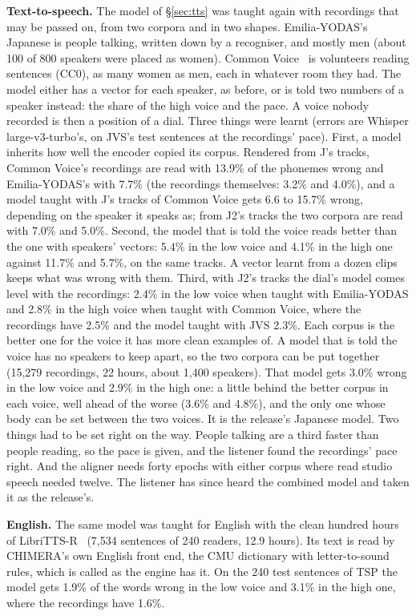 \documentclass[10pt,a4paper,twocolumn]{article}
\begin{document}
\textbf{Text-to-speech.} The model of \S\ref{sec:tts} was taught again with recordings that may
be passed on, from two corpora and in two shapes. Emilia-YODAS's Japanese is people talking,
written down by a recogniser, and mostly men (about 100 of 800 speakers were placed as women).
Common Voice~\cite{commonvoice} is volunteers reading sentences (CC0), as many women as men,
each in whatever room they had. The model either has a vector for each speaker, as before, or is
told two numbers of a speaker instead: the share of the high voice and the pace. A voice nobody
recorded is then a position of a dial. Three things were learnt (errors are Whisper
large-v3-turbo's, on JVS's test sentences at the recordings' pace). First, a model inherits how
well the encoder copied its corpus. Rendered from J's tracks, Common Voice's recordings are read
with 13.9\% of the phonemes wrong and Emilia-YODAS's with 7.7\% (the recordings themselves: 3.2\%
and 4.0\%), and a model taught with J's tracks of Common Voice gets 6.6 to 15.7\% wrong,
depending on the speaker it speaks as; from J2's tracks the two corpora are read with 7.0\% and
5.0\%. Second, the model that is told the voice reads better than the one with speakers' vectors:
5.4\% in the low voice and 4.1\% in the high one against 11.7\% and 5.7\%, on the same tracks. A
vector learnt from a dozen clips keeps what was wrong with them. Third, with J2's tracks the
dial's model comes level with the recordings: 2.4\% in the low voice when taught with
Emilia-YODAS and 2.8\% in the high voice when taught with Common Voice, where the recordings have
2.5\% and the model taught with JVS 2.3\%. Each corpus is the better one for the voice it has
more clean examples of. A model that is told the voice has no speakers to keep apart, so the two
corpora can be put together (15,279 recordings, 22 hours, about 1,400 speakers). That model gets
3.0\% wrong in the low voice and 2.9\% in the high one: a little behind the better corpus in
each voice, well ahead of the worse (3.6\% and 4.8\%), and the only one whose body can be set
between the two voices. It is the release's Japanese model. Two things had to be set right on
the way. People talking are a third faster than people reading, so the pace is given, and the
listener found the recordings' pace right. And the aligner needs forty epochs with either corpus
where read studio speech needed twelve. The listener has since heard the combined model and
taken it as the release's.

\textbf{English.} The same model was taught for English with the clean hundred hours of
LibriTTS-R~\cite{librittsr} (7,534 sentences of 240 readers, 12.9 hours). Its text is read by
CHIMERA's own English front end, the CMU dictionary with letter-to-sound rules, which is called
as the engine has it. On the 240 test sentences of TSP the model gets 1.9\% of the words
wrong in the low voice and 3.1\% in the high one, where the recordings have 1.6\%.
\end{document}
